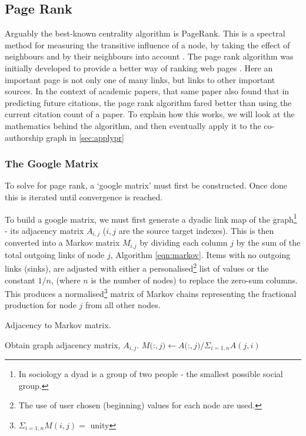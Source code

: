      
% 
% 






\subsection{Page Rank}\label{sec:pagerank}
Arguably the best-known centrality algorithm is PageRank. This is a spectral method for measuring the transitive influence of a node, by taking the effect of neighbours and by their neighbours into account \citep{neoj4}. The page rank algorithm was initially developed to provide a better way of ranking web pages \citep{google}. Here an important page is not only one of many links, but links to other important sources. In the context of academic papers, that same paper also found that in predicting future citations, the page rank algorithm fared better than using the current citation count of a paper. 
To explain how this works, we will look at the mathematics behind the algorithm, and then eventually apply it to the co-authorship graph in \autoref{sec:applypr}

\subsubsection{The Google Matrix}
To solve for page rank, a `google matrix' must first be constructed. Once done this is iterated until convergence is reached. 

To build a google matrix, we must first generate a dyadic link map of the graph\footnote{In sociology a dyad is a group of two people - the smallest possible social group.} - its adjacency matrix $A_{i,j}$ ($i,j$ are the source target indexes). This is then converted into a Markov matrix $M_{i.j}$ by dividing each column $j$ by the sum of the total outgoing links of node $j$, Algorithm \ref{eqn:markov}.
Items with no outgoing links (sinks), are adjusted with either a personalised\footnote{The use of user chosen (beginning) values for each node are used.} list of values or the constant $1/n$, (where $n$ is the number of nodes) to replace the zero-sum columns. This produces a normalised\footnote{ \: $\Sigma_{i=1,n} M(i,j) = $ unity} matrix of Markov chains representing the fractional production for node $j$ from all other nodes.

\begin{algorithm} \caption{Adjacency to Markov matrix.}
\begin{algorithmic}[1]
\State Obtain graph adjacency matrix, $A_{i,j}$.
\Repeat
{}
\State $M($:$,j) \gets A($:$,j) / \Sigma_{i=1,n} A(j,i)$
\EndFor
{}

\end{algorithmic}\label{eqn:markov}
\end{algorithm}



